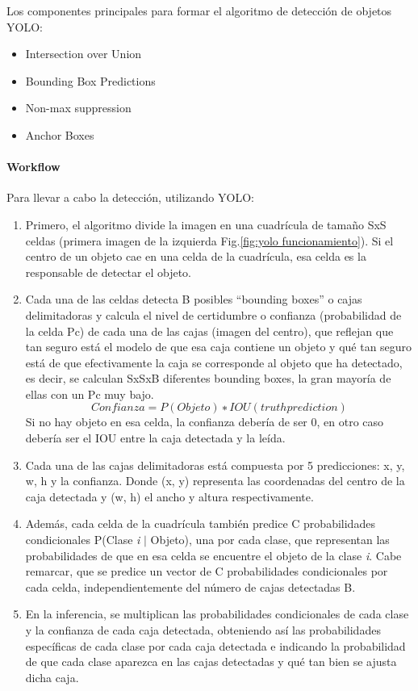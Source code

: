 Los componentes principales para formar el algoritmo de detección de objetos YOLO:
    \begin{itemize}
         \item Intersection over Union
         \item Bounding Box Predictions
         \item Non-max suppression
         \item Anchor Boxes
    \end{itemize}

\paragraph{Workflow}
Para llevar a cabo la detección, utilizando YOLO:
\begin{enumerate}
    \item Primero, el algoritmo divide la imagen en una cuadrícula de tamaño SxS celdas (primera imagen de la izquierda Fig.\ref{fig:yolo funcionamiento}). Si el centro de un objeto cae en una celda de la cuadrícula, esa celda es la responsable de detectar el objeto.\\
    \item Cada una de las celdas detecta B posibles “bounding boxes” o cajas delimitadoras y calcula el nivel de certidumbre o confianza (probabilidad de la celda Pc) de cada una de las cajas (imagen del centro), que reflejan que tan seguro está el modelo de que esa caja contiene un objeto y qué tan seguro está de que efectivamente la caja se corresponde al objeto que ha detectado, es decir, se calculan SxSxB diferentes bounding boxes, la gran mayoría de ellas con un Pc muy bajo.
    \[Confianza = P(Objeto) ∗ IOU (truth prediction)\] Si no hay objeto en esa celda, la confianza debería de ser 0, en otro caso debería ser el IOU entre la caja detectada y la leída.\\
    \item Cada una de las cajas delimitadoras está compuesta por 5 predicciones: x, y, w, h y la confianza. Donde (x, y) representa las coordenadas del centro de la caja detectada y (w, h) el ancho y altura respectivamente.\\
    \item Además, cada celda de la cuadrícula también predice C probabilidades condicionales P(Clase \textit{i} $|$ Objeto), una por cada clase, que representan las probabilidades de que en esa celda se encuentre el objeto de la clase \textit{i}. Cabe remarcar, que se predice un vector de C probabilidades condicionales por cada celda, independientemente del número de cajas detectadas B.\\
    \item
    En la inferencia, se multiplican las probabilidades condicionales de cada clase y la confianza de cada caja detectada, obteniendo así las probabilidades específicas de cada clase por cada caja detectada e indicando la probabilidad de que cada clase aparezca en las cajas detectadas y qué tan bien se ajusta dicha caja.
\end{enumerate}



